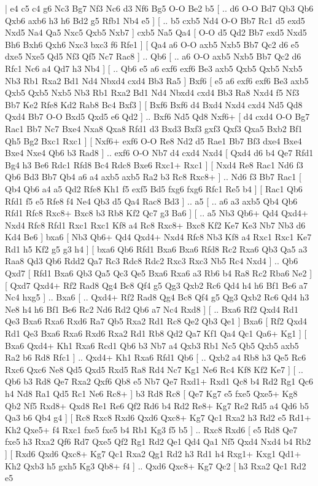 \makegametitle 
|   e4   c5    c4   g6    Nc3   Bg7    Nf3   Nc6    d3  Nf6    Bg5   O-O    Be2   b5 [ .. d6  O-O Bd7  Qb3 Qb6  Qxb6 axb6  h3 h6  Bd2 g5  Rfb1 Nb4  e5   ]  [ .. b5  cxb5 Nd4  O-O Bb7  Rc1 d5  exd5 Nxd5  Na4 Qa5  Nxc5 Qxb5  Nxb7   ]  cxb5   Na5    Qa4 [  O-O d5  Qd2 Bb7  exd5 Nxd5  Bh6 Bxh6  Qxh6 Nxc3  bxc3 f6  Rfe1   ]  [  Qa4 a6  O-O axb5  Nxb5 Bb7  Qc2 d6  e5 dxe5  Nxe5 Qd5  Nf3 Qf5  Nc7 Rac8   ] .. Qb6 [ .. a6  O-O axb5  Nxb5 Bb7  Qc2 d6  Rfc1 Nc6  a4 Qd7  h3 Nb4   ]  [ .. Qb6  e5 a6  exf6 exf6  Be3 axb5  Qxb5 Qxb5  Nxb5 Nb3  Rb1 Rxa2  Bd1 Nd4  Nbxd4 cxd4  Bb3 Ra5   ]  Bxf6 [  e5 a6  exf6 exf6  Be3 axb5  Qxb5 Qxb5  Nxb5 Nb3  Rb1 Rxa2  Bd1 Nd4  Nbxd4 cxd4  Bb3 Ra8  Nxd4 f5  Nf3 Bb7  Ke2 Rfe8  Kd2 Rab8  Bc4 Bxf3   ]  [  Bxf6 Bxf6  d4 Bxd4  Nxd4 cxd4  Nd5 Qd8  Qxd4 Bb7  O-O Bxd5  Qxd5 e6  Qd2   ] .. Bxf6    Nd5   Qd8    Nxf6+ [  d4 cxd4  O-O Bg7  Rac1 Bb7  Nc7 Bxe4  Nxa8 Qxa8  Rfd1 d3  Bxd3 Bxf3  gxf3 Qxf3  Qxa5 Bxb2  Bf1 Qh5  Bg2 Bxc1  Rxc1   ]  [  Nxf6+ exf6  O-O Re8  Nd2 d5  Rae1 Bb7  Bf3 dxe4  Bxe4 Bxe4  Nxe4 Qb6  b3 Rad8   ] .. exf6    O-O   Nb7    d4   cxd4    Nxd4 [  Qxd4 d6  b4 Qe7  Rfd1 Bg4  h3 Be6  Rdc1 Rfd8  Bc4 Rdc8  Bxe6 Rxc1+  Rxc1   ]  [  Nxd4 Re8  Rac1 Nd6  f3 Qb6  Bd3 Bb7  Qb4 a6  a4 axb5  axb5 Ra2  b3 Rc8  Rxc8+   ] .. Nd6    f3   Bb7    Rac1 [  Qb4 Qb6  a4 a5  Qd2 Rfe8  Kh1 f5  exf5 Bd5  fxg6 fxg6  Rfc1 Re5  b4   ]  [  Rac1 Qb6  Rfd1 f5  e5 Rfe8  f4 Ne4  Qb3 d5  Qa4 Rac8  Bd3   ] .. a5 [ .. a6  a3 axb5  Qb4 Qb6  Rfd1 Rfc8  Rxc8+ Bxc8  b3 Rb8  Kf2 Qc7  g3 Ba6   ]  [ .. a5  Nb3 Qb6+  Qd4 Qxd4+  Nxd4 Rfc8  Rfd1 Rxc1  Rxc1 Kf8  a4 Rc8  Rxc8+ Bxc8  Kf2 Ke7  Ke3 Nb7  Nb3 d6  Kd4 Be6   ]  bxa6 [  Nb3 Qb6+  Qd4 Qxd4+  Nxd4 Rfc8  Nb3 Kf8  a4 Rxc1  Rxc1 Ke7  Rd1 h5  Kf2 g5  g3 h4   ]  [  bxa6 Qb6  Rfd1 Bxa6  Bxa6 Rfd8  Rc2 Rxa6  Qb3 Qa5  a3 Raa8  Qd3 Qb6  Rdd2 Qa7  Rc3 Rdc8  Rdc2 Rxc3  Rxc3 Nb5  Rc4 Nxd4   ] .. Qb6    Qxd7 [  Rfd1 Bxa6  Qb3 Qa5  Qc3 Qe5  Bxa6 Rxa6  a3 Rb6  b4 Ra8  Rc2 Rba6  Ne2   ]  [  Qxd7 Qxd4+  Rf2 Rad8  Qg4 Bc8  Qf4 g5  Qg3 Qxb2  Rc6 Qd4  h4 h6  Bf1 Be6  a7 Nc4  hxg5   ] .. Bxa6 [ .. Qxd4+  Rf2 Rad8  Qg4 Bc8  Qf4 g5  Qg3 Qxb2  Rc6 Qd4  h3 Ne8  h4 h6  Bf1 Be6  Rc2 Nd6  Rd2 Qb6  a7 Nc4  Rxd8   ]  [ .. Bxa6  Rf2 Qxd4  Rd1 Qe3  Bxa6 Rxa6  Rxd6 Ra7  Qb5 Rxa2  Rd1 Rc8  Qe2 Qb3  Qe1   ]  Bxa6 [  Rf2 Qxd4  Rd1 Qe3  Bxa6 Rxa6  Rxd6 Rxa2  Rd1 Rb8  Qd2 Qa7  Kf1 Qa4  Qc1 Qa6+  Kg1   ]  [  Bxa6 Qxd4+  Kh1 Rxa6  Rcd1 Qb6  b3 Nb7  a4 Qxb3  Rb1 Nc5  Qb5 Qxb5  axb5 Ra2  b6 Rd8  Rfc1   ] .. Qxd4+    Kh1   Rxa6    Rfd1   Qb6 [ .. Qxb2  a4 Rb8  h3 Qe5  Rc6 Rxc6  Qxc6 Ne8  Qd5 Qxd5  Rxd5 Ra8  Rd4 Nc7  Kg1 Ne6  Rc4 Kf8  Kf2 Ke7   ]  [ .. Qb6  b3 Rd8  Qe7 Rxa2  Qxf6 Qb8  e5 Nb7  Qe7 Rxd1+  Rxd1 Qc8  b4 Rd2  Rg1 Qc6  h4 Nd8  Ra1 Qd5  Rc1 Ne6  Rc8+   ]  b3   Rd8    Rc8 [  Qe7 Kg7  e5 fxe5  Qxe5+ Kg8  Qb2 Nf5  Rxd8+ Qxd8  Re1 Re6  Qf2 Rd6  b4 Rd2  Re8+ Kg7  Re2 Rd5  a4 Qd6  b5 Qa3  b6 Qb4  g4   ]  [  Rc8 Rxc8  Rxd6 Qxd6  Qxc8+ Kg7  Qc1 Rxa2  h3 Rd2  e5 Rd1+  Kh2 Qxe5+  f4 Rxc1  fxe5 fxe5  b4 Rb1  Kg3 f5  b5   ] .. Rxc8    Rxd6 [  e5 Rd8  Qe7 fxe5  h3 Rxa2  Qf6 Rd7  Qxe5 Qf2  Rg1 Rd2  Qe1 Qd4  Qa1 Nf5  Qxd4 Nxd4  b4 Rb2   ]  [  Rxd6 Qxd6  Qxc8+ Kg7  Qc1 Rxa2  Qg1 Rd2  h3 Rd1  h4 Rxg1+  Kxg1 Qd1+  Kh2 Qxb3  h5 gxh5  Kg3 Qb8+  f4   ] .. Qxd6    Qxc8+   Kg7    Qc2 [  h3 Rxa2  Qc1 Rd2  e5 